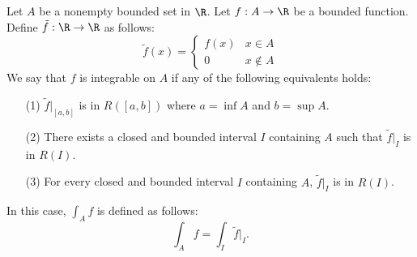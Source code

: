 \begin{remark}
    Let \( A  \) be a nonempty bounded set in \( \R  \). Let \( f: A \to \R  \) be a bounded function. Define \( \tilde{f} : \R \to \R  \) as follows: 
    \[  \tilde{f}(x) = 
    \begin{cases}
        f(x) & x \in A  \\
        0 & x \notin A 
    \end{cases} \]
    We say that \( f  \) is integrable on \( A  \) if any of the following equivalents holds: 
    \begin{enumerate}
        \item[(1)] \( \tilde{f} \Big|_{[a,b]} \) is in \( R([a,b]) \) where \( a = \inf A  \) and \( b = \sup A  \).
        \item[(2)] There exists a closed and bounded interval \( I  \) containing \( A  \) such that \( \tilde{f} \Big|_{I} \) is in \( R(I) \).
        \item[(3)] For every closed and bounded interval \( I  \) containing \( A  \), \( \tilde{f} \Big|_{I} \) is in \( R(I) \).
    \end{enumerate}
    In this case, \( \int_{ A  } f   \) is defined as follows:
    \[  \int_{ A  } f  = \int_{ I  } \tilde{f} \Big|_{I}. \tag{where \( I  \) is any closed and bounded interval} \]
\end{remark}

